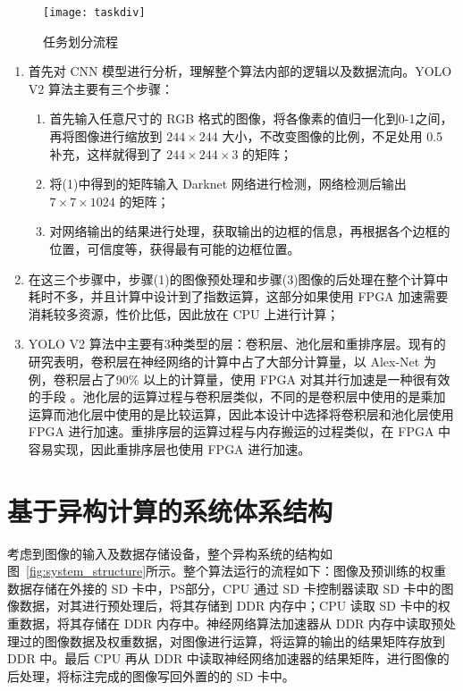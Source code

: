 \begin{figure}[!htbp]
    \centering
    \texttt{[image: taskdiv]}
    \caption{任务划分流程}
    \label{fig:taskdiv}
\end{figure}

\begin{enumerate}
\item 首先对 CNN 模型进行分析，理解整个算法内部的逻辑以及数据流向。YOLO V2 算法主要有三个步骤：

    \begin{enumerate}
    \item 首先输入任意尺寸的 RGB 格式的图像，将各像素的值归一化到0-1之间，再将图像进行缩放到 $244 \times 244$ 大小，不改变图像的比例，不足处用 0.5 补充，这样就得到了 $244 \times 244 \times 3$ 的矩阵；
    \item 将(1)中得到的矩阵输入 Darknet 网络进行检测，网络检测后输出 $7 \times 7 \times 1024$ 的矩阵；
    \item 对网络输出的结果进行处理，获取输出的边框的信息，再根据各个边框的位置，可信度等，获得最有可能的边框位置。
    \end{enumerate}

\item 在这三个步骤中，步骤(1)的图像预处理和步骤(3)图像的后处理在整个计算中耗时不多，并且计算中设计到了指数运算，这部分如果使用 FPGA 加速需要消耗较多资源，性价比低，因此放在 CPU 上进行计算；
\item YOLO V2 算法中主要有3种类型的层：卷积层、池化层和重排序层。现有的研究表明，卷积层在神经网络的计算中占了大部分计算量，以 Alex-Net 为例，卷积层占了90\% \citep{chen2016eyeriss} 以上的计算量，使用 FPGA 对其并行加速是一种很有效的手段 \citep{farabet2009cnp,peemen2013memory,chen2014diannao}。池化层的运算过程与卷积层类似，不同的是卷积层中使用的是乘加运算而池化层中使用的是比较运算，因此本设计中选择将卷积层和池化层使用 FPGA 进行加速。重排序层的运算过程与内存搬运的过程类似，在 FPGA 中容易实现，因此重排序层也使用 FPGA 进行加速。
\end{enumerate}

\section{基于异构计算的系统体系结构}

考虑到图像的输入及数据存储设备，整个异构系统的结构如图~\ref{fig:system_structure}所示。整个算法运行的流程如下：图像及预训练的权重数据存储在外接的 SD 卡中，PS部分，CPU 通过 SD 卡控制器读取 SD 卡中的图像数据，对其进行预处理后，将其存储到 DDR 内存中；CPU 读取 SD 卡中的权重数据，将其存储在 DDR 内存中。神经网络算法加速器从 DDR 内存中读取预处理过的图像数据及权重数据，对图像进行运算，将运算的输出的结果矩阵存放到 DDR 中。最后 CPU 再从 DDR 中读取神经网络加速器的结果矩阵，进行图像的后处理，将标注完成的图像写回外置的的 SD 卡中。

